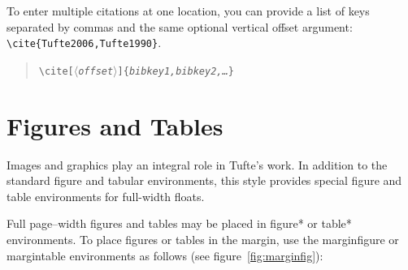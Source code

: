 \documentclass{tufte-handout}
\newcommand{\doccmd}[1]{\texttt{\textbackslash#1}}%
\newcommand{\docopt}[1]{\ensuremath{\langle}\textrm{\textit{#1}}\ensuremath{\rangle}}%
\newcommand{\docarg}[1]{\textrm{\textit{#1}}}%
\newcommand{\docenv}[1]{\textsf{#1}}%
\newenvironment{docspec}{\begin{quote}\noindent}{\end{quote}}%
\begin{document}
To enter multiple citations at one location,\cite{Tufte2006,Tufte1990} you can
provide a list of keys separated by commas and the same optional vertical
offset argument: \Verb|\cite{Tufte2006,Tufte1990}|.
\begin{docspec}
  \doccmd{cite[\docopt{offset}]\{\docarg{bibkey1,bibkey2,\ldots}\}}
\end{docspec}

\section{Figures and Tables}\label{sec:figures-and-tables}
Images and graphics play an integral role in Tufte's work.
In addition to the standard \docenv{figure} and \docenv{tabular} environments,
this style provides special figure and table environments for full-width
floats.

Full page--width figures and tables may be placed in \docenv{figure*} or
\docenv{table*} environments.  To place figures or tables in the margin,
use the \docenv{marginfigure} or \docenv{margintable} environments as follows
(see figure~\ref{fig:marginfig}):
\end{document}

